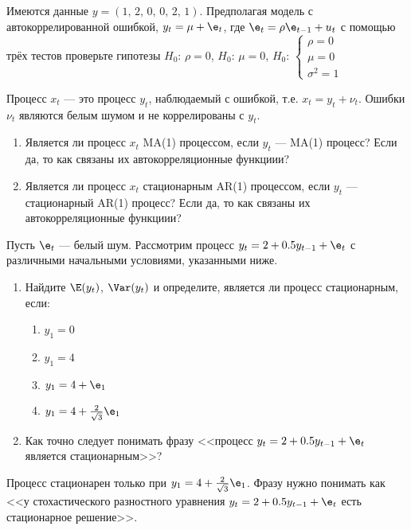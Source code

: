 \begin{solution}
\end{solution}



\begin{problem}
Имеются данные $y=(1,\, 2,\, 0,\,  0,\, 2,\, 1)$. Предполагая модель с автокоррелированной ошибкой, $y_t=\mu+\e_t$, где $\e_t=\rho \e_{t-1}+u_t$ с помощью трёх тестов проверьте гипотезы
$H_0$: $\rho=0$, 
$H_0$: $\mu=0$, 
$H_0$: $\begin{cases}
\rho=0 \\
\mu = 0 \\
\sigma^2=1 
\end{cases}$
\end{problem}


\begin{solution}

\end{solution}


\begin{problem}
Процесс $x_t$ --- это процесс $y_t$, наблюдаемый с ошибкой, т.е. $x_t=y_t+\nu_t$. Ошибки $\nu_t$ являются белым шумом и не коррелированы с $y_t$. 
\begin{enumerate}
\item Является ли процесс $x_t$ MA(1) процессом, если $y_t$ ---  MA(1) процесс? Если да, то как связаны их автокорреляционные функциии?
\item Является ли процесс $x_t$ стационарным AR(1) процессом, если $y_t$ ---  стационарный AR(1) процесс? Если да, то как связаны их автокорреляционные функциии?
\end{enumerate}
\end{problem}

\begin{solution}

\end{solution}

\begin{problem}
Пусть $\e_t$ --- белый шум. Рассмотрим процесс $y_t=2+0.5y_{t-1}+\e_t$ с различными начальными условиями, указанными ниже.

\begin{enumerate}
\item Найдите $\E(y_t)$, $\Var(y_t)$ и определите, является ли процесс  стационарным, если:
\begin{enumerate}
\item $y_1=0$
\item $y_1=4$
\item $y_1=4+\e_1$
\item $y_1=4+\frac{2}{\sqrt{3}}\e_1$
\end{enumerate}
\item Как точно следует понимать фразу <<процесс $y_t=2+0.5y_{t-1}+\e_t$ является стационарным>>?
\end{enumerate}

\end{problem}


\begin{solution}
Процесс стационарен только при $y_1=4+\frac{2}{\sqrt{3}}\e_1$. Фразу нужно понимать как <<у стохастического разностного уравнения $y_t=2+0.5y_{t-1}+\e_t$ есть стационарное решение>>.
\end{solution}


